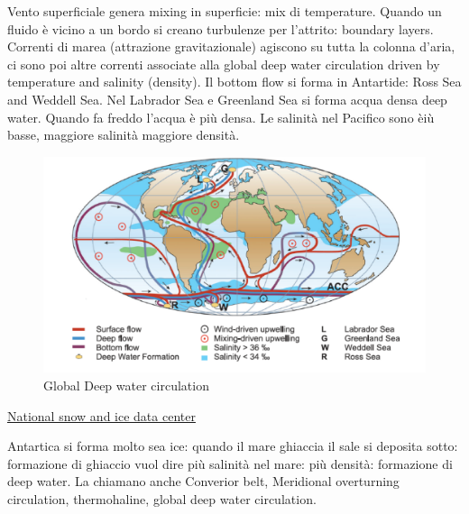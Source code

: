Vento superficiale genera mixing in superficie: mix di temperature. Quando un fluido è vicino a un bordo si creano turbulenze per l'attrito: boundary layers. Correnti di marea (attrazione gravitazionale) agiscono su tutta la colonna d'aria, ci sono poi altre correnti associate alla global deep water circulation driven by temperature and salinity (density). Il bottom flow si forma in Antartide: Ross Sea and Weddell Sea. Nel Labrador Sea e Greenland Sea si forma acqua densa deep water. Quando fa freddo l'acqua è più densa. Le salinità nel Pacifico sono èiù basse, maggiore salinità maggiore densità.
\begin{figure}[htpb]
    \centering
    \includegraphics[width=0.5\linewidth]{uploads/global deep.png}
    \caption{Global Deep water circulation}
    \label{fig:deep water}
\end{figure}
\href{https://nsidc.org/home}{National snow and ice data center}

Antartica si forma molto sea ice: quando il mare ghiaccia il sale si deposita sotto: formazione di ghiaccio vuol dire più salinità nel mare: più densità: formazione di deep water. La chiamano anche Converior belt, Meridional overturning circulation, thermohaline, global deep water circulation.
